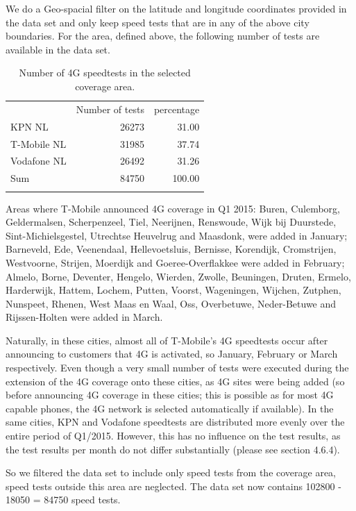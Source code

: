 \documentclass[]{article}
\begin{document}
We do a Geo-spacial filter on the latitude and longitude coordinates
provided in the data set and only keep speed tests that are in any of
the above city boundaries. For the area, defined above, the following
number of tests are available in the data set.

\begin{longtable}[c]{@{}lrr@{}}
\toprule\addlinespace
& Number of tests & percentage
\\\addlinespace
\midrule\endhead
KPN NL & 26273 & 31.00
\\\addlinespace
T-Mobile NL & 31985 & 37.74
\\\addlinespace
Vodafone NL & 26492 & 31.26
\\\addlinespace
Sum & 84750 & 100.00
\\\addlinespace
\bottomrule
\addlinespace
\caption{Number of 4G speedtests in the selected coverage area.}
\end{longtable}

Areas where T-Mobile announced 4G coverage in Q1 2015: Buren, Culemborg,
Geldermalsen, Scherpenzeel, Tiel, Neerijnen, Renswoude, Wijk bij
Duurstede, Sint-Michielsgestel, Utrechtse Heuvelrug and Maasdonk, were
added in January; Barneveld, Ede, Veenendaal, Hellevoetsluis, Bernisse,
Korendijk, Cromstrijen, Westvoorne, Strijen, Moerdijk and
Goeree-Overflakkee were added in February; Almelo, Borne, Deventer,
Hengelo, Wierden, Zwolle, Beuningen, Druten, Ermelo, Harderwijk, Hattem,
Lochem, Putten, Voorst, Wageningen, Wijchen, Zutphen, Nunspeet, Rhenen,
West Maas en Waal, Oss, Overbetuwe, Neder-Betuwe and Rijssen-Holten were
added in March.

Naturally, in these cities, almost all of T-Mobile's 4G speedtests occur
after announcing to customers that 4G is activated, so January, February
or March respectively. Even though a very small number of tests were
executed during the extension of the 4G coverage onto these cities, as
4G sites were being added (so before announcing 4G coverage in these
cities; this is possible as for most 4G capable phones, the \newpage 4G
network is selected automatically if available). In the same cities, KPN
and Vodafone speedtests are distributed more evenly over the entire
period of Q1/2015. However, this has no influence on the test results,
as the test results per month do not differ substantially (please see
section 4.6.4).

So we filtered the data set to include only speed tests from the
coverage area, speed tests outside this area are neglected. The data set
now contains 102800 - 18050 = 84750 speed tests.
\end{document}
